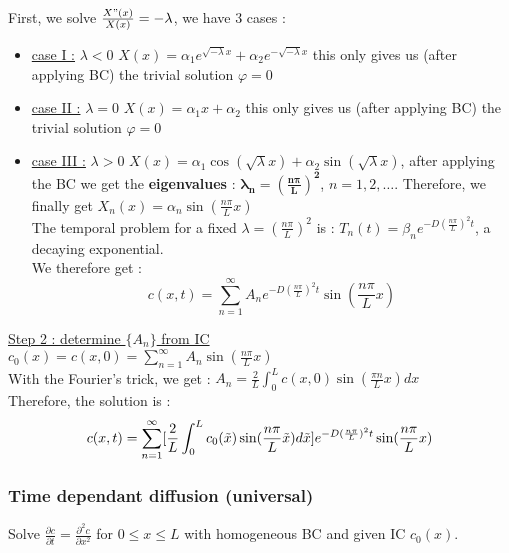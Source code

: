 \documentclass[../main.tex]{subfiles}
\begin{document}
First, we solve $\frac{X"(x)}{X(x)} = -\lambda$, we have 3 cases : \\
\begin{itemize}
    \item \underline{case I :} $\lambda<0$ $X(x) = \alpha_1 e^{\sqrt{-\lambda}x}+\alpha_2 e^{-\sqrt{-\lambda}x}$ this only gives us (after applying BC) the trivial solution $\varphi=0$\\
    \item \underline{case II :} $\lambda=0$ $X(x) = \alpha_1 x + \alpha_2$ this only gives us (after applying BC) the trivial solution $\varphi=0$\\
    \item \underline{case III :} $\lambda > 0$ $X(x) = \alpha_1 \cos(\sqrt{\lambda} x) + \alpha_2 \sin(\sqrt{\lambda} x)$, after applying the BC we get the \textbf{eigenvalues} : $\mathbf{\lambda_n = (\frac{n \pi}{L})^2}$, $n=1,2,\dots$. Therefore, we finally get $X_n(x) = \alpha_n \sin(\frac{n \pi}{L} x)$\\ 

The temporal problem for a fixed $\lambda = (\frac{n\pi}{L})^2$ is : $T_n(t) = \beta_n e^{-D(\frac{n\pi}{L})^2t}$, a decaying exponential.\\
We therefore get : \\
\begin{equation}
    c(x,t) = \sum_{n=1}^\infty A_n e^{-D(\frac{n\pi}{L})^2t} \sin(\frac{n\pi}{L}x)
\end{equation}
\end{itemize}

\quad \underline{Step 2 : determine $\{A_n\}$ from IC}\\
$c_0(x) = c(x,0) = \sum_{n=1}^\infty A_n \sin(\frac{n\pi}{L}x)$\\

With the Fourier's trick, we get : $A_n = \frac{2}{L} \int_0^L c(x,0) \sin(\frac{\pi n}{L}x)dx$\\

Therefore, the solution is :\\
\begin{equation}
    c(x,t) = \sum_{n=1}^\infty [\frac{2}{L} \int_0^L c_0(\Tilde{x}) \sin(\frac{n \pi}{L} \Tilde{x})d\Tilde{x} ] e^{-D(\frac{n\pi}{L})^2t} \sin(\frac{n\pi}{L}x)
\end{equation}

\subsubsection{Time dependant diffusion (universal)}
Solve $\frac{\partial c}{\partial t} = \frac{\partial^2 c}{\partial x^2}$ for $0\leq x \leq L$ with homogeneous BC and given IC $c_0(x)$.\\
\end{document}
